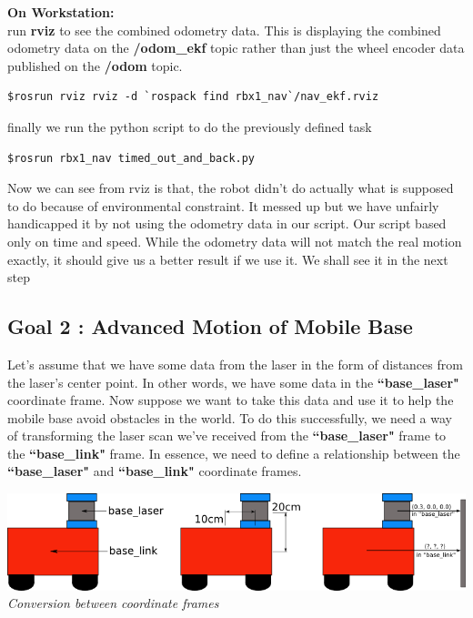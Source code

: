 \documentclass[10pt,a4paper]{article}
\begin{document}
\textbf{On Workstation:}\\
run \textbf{rviz} to see the combined odometry data. This is displaying the combined odometry data on the \textbf{/odom\_ekf} topic rather than just the wheel encoder data published on the \textbf{/odom} topic.
\begin{lstlisting}[frame=single] 
$rosrun rviz rviz -d `rospack find rbx1_nav`/nav_ekf.rviz
\end{lstlisting}
finally we run the python script to do the previously defined task 
\begin{lstlisting}[frame=single] 
$rosrun rbx1_nav timed_out_and_back.py
\end{lstlisting}

Now we can see from rviz is that, the robot didn't do actually what is supposed to do
because of environmental constraint. It messed up but we have unfairly handicapped it 
by not using the odometry data in our script. Our script based only on time and speed. 
While the odometry data will not match the real motion exactly, 
it should give us a better result if we use it. We shall see it in the next step

\subsection{Goal 2 : Advanced Motion of Mobile Base}
Let's assume that we have some data from the laser in the form of distances from the laser's center point. In other words, we have some data in the \textbf{``base\_laser"} coordinate frame. Now suppose we want to take this data and use it to help the mobile base avoid obstacles in the world. To do this successfully, we need a way of transforming the laser scan we've received from the \textbf{``base\_laser"} frame to the \textbf{``base\_link"} frame. In essence, we need to define a relationship between the \textbf{``base\_laser"} and \textbf{``base\_link"} coordinate frames.\\

\begin{center}
\includegraphics[width=\textwidth]{images/simple_robot.png}\\
\textit{Conversion between coordinate frames}
\end{center}
\end{document}
